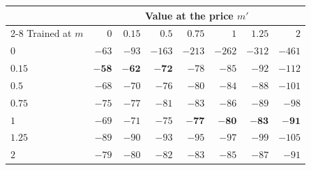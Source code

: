 \begin{tabular}{lrrrrrrr}
\toprule
 & \multicolumn{7}{c}{Value at the price $m'$} \\
\cmidrule(lr){2-8}
Trained at $m$ & $0$ & $0.15$ & $0.5$ & $0.75$ & $1$ & $1.25$ & $2$ \\
\midrule
$0$ & $-63$ & $-93$ & $-163$ & $-213$ & $-262$ & $-312$ & $-461$ \\
$0.15$ & $\mathbf{-58}$ & $\mathbf{-62}$ & $\mathbf{-72}$ & $-78$ & $-85$ & $-92$ & $-112$ \\
$0.5$ & $-68$ & $-70$ & $-76$ & $-80$ & $-84$ & $-88$ & $-101$ \\
$0.75$ & $-75$ & $-77$ & $-81$ & $-83$ & $-86$ & $-89$ & $-98$ \\
$1$ & $-69$ & $-71$ & $-75$ & $\mathbf{-77}$ & $\mathbf{-80}$ & $\mathbf{-83}$ & $\mathbf{-91}$ \\
$1.25$ & $-89$ & $-90$ & $-93$ & $-95$ & $-97$ & $-99$ & $-105$ \\
$2$ & $-79$ & $-80$ & $-82$ & $-83$ & $-85$ & $-87$ & $-91$ \\
\bottomrule
\end{tabular}
